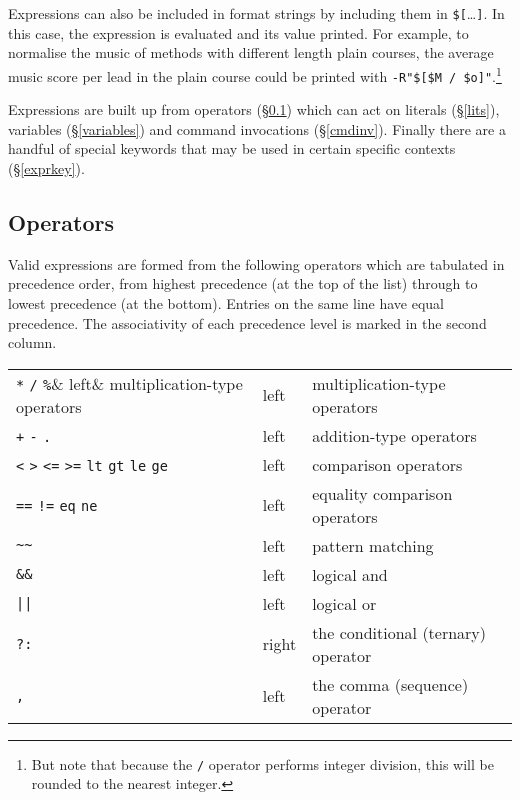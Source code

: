 \documentclass[a4paper,11pt,oneside]{book}
\newcommand{\sref}[1]{\hyperref[#1]{\S\ref{#1}}}
\begin{document}
Expressions can also be included in format strings by including them
in \verb+$[+\ldots\verb+]+.  In this case, the expression is evaluated and
its value printed.  For example, to normalise the music of
methods with different length plain courses, the
average music score per lead in the plain course could be printed with
\verb+-R"$[$M / $o]"+.\footnote{But note that because the \verb+/+ operator
performs integer division, this will be rounded to the nearest integer.}

Expressions are built up from operators (\sref{oper}) which can act 
on literals (\sref{lits}), variables (\sref{variables}) and 
command invocations (\sref{cmdinv}).  Finally there are a handful of 
special keywords that may be used in certain specific contexts 
(\sref{exprkey}).

\subsection{Operators}\label{oper}

Valid expressions are formed from the following operators 
which are tabulated in precedence%
 order, 
from highest precedence (at the top of the list) through to lowest 
precedence (at the bottom).  Entries on the same line have equal precedence.
The associativity%
 of each precedence level 
is marked in the second column.

\begin{tabular}{l@{\quad}l@{\quad}l}
\verb+*+ \verb+/+ \verb+%+& left& multiplication-type operators\\
\verb-+- \verb+-+ \verb+.+& left& addition-type operators\\
\verb+<+ \verb+>+ \verb+<=+ \verb+>=+ \verb+lt+ \verb+gt+ \verb+le+ \verb+ge+&
                            left& comparison operators\\
\verb+==+ \verb+!=+ \verb+eq+ \verb+ne+&
                            left& equality comparison operators\\
\verb+~~+&                  left& pattern matching\\
\verb+&&+&                  left& logical and\\
\verb+||+&                  left& logical or\\
\verb+?:+&                  right& the conditional (ternary) operator\\
\verb+,+&                   left& the comma (sequence) operator\\
\end{tabular}
\end{document}
